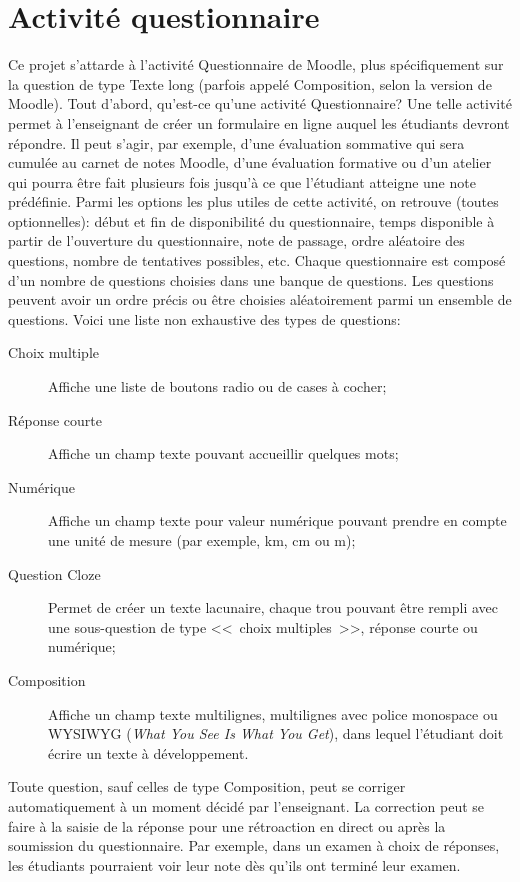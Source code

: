 \section{Activit\'e questionnaire}
Ce projet s'attarde \`a l'activit\'e Questionnaire de Moodle, plus sp\'ecifiquement sur la question de type Texte long (parfois appel\'e Composition, selon la version de Moodle).
Tout d'abord, qu'est-ce qu'une activit\'e Questionnaire?
Une telle activit\'e permet \`a l'enseignant de cr\'eer un formulaire en ligne auquel les \'etudiants devront r\'epondre.
Il peut s'agir, par exemple, d'une \'evaluation sommative qui sera cumul\'ee au carnet de notes Moodle, d'une \'evaluation formative ou d'un atelier qui pourra \^etre fait plusieurs fois jusqu'\`a ce que l'\'etudiant atteigne une note pr\'ed\'efinie.
Parmi les options les plus utiles de cette activit\'e, on retrouve (toutes optionnelles): d\'ebut et fin de disponibilit\'e du questionnaire, temps disponible \`a partir de l'ouverture du questionnaire, note de passage, ordre al\'eatoire des questions, nombre de tentatives possibles, etc.
Chaque questionnaire est compos\'e d'un nombre de questions choisies dans une banque de questions.
Les questions peuvent avoir un ordre pr\'ecis ou \^etre choisies al\'eatoirement parmi un ensemble de questions.
Voici une liste non exhaustive des types de questions:
\begin{description}
  \item[Choix multiple]
  
  Affiche une liste de boutons radio ou de cases \`a cocher;
  
  \item[R\'eponse courte]
  
  Affiche un champ texte pouvant accueillir quelques mots;
  
  \item[Num\'erique]
  
  Affiche un champ texte pour valeur num\'erique pouvant prendre en compte une unit\'e de mesure (par exemple, km, cm ou m);
  
  \item[Question Cloze]
  
  Permet de cr\'eer un texte lacunaire, chaque \og trou \fg{} pouvant \^etre rempli avec une sous-question de type <<~choix multiples~>>, r\'eponse courte ou num\'erique;
  
  \item[Composition]
  
  Affiche un champ texte multilignes, multilignes avec police monospace ou WYSIWYG (\textit{What You See Is What You Get}), dans lequel
  l'\'etudiant doit \'ecrire un texte \`a d\'eveloppement.
\end{description}
Toute question, sauf celles de type Composition, peut se corriger automatiquement \`a un moment d\'ecid\'e par l'enseignant.
La correction peut se faire \`a la saisie de la r\'eponse pour une r\'etroaction en direct ou apr\`es la soumission du questionnaire.
Par exemple, dans un examen \`a choix de r\'eponses, les \'etudiants pourraient voir leur note d\`es qu'ils ont termin\'e leur examen.

